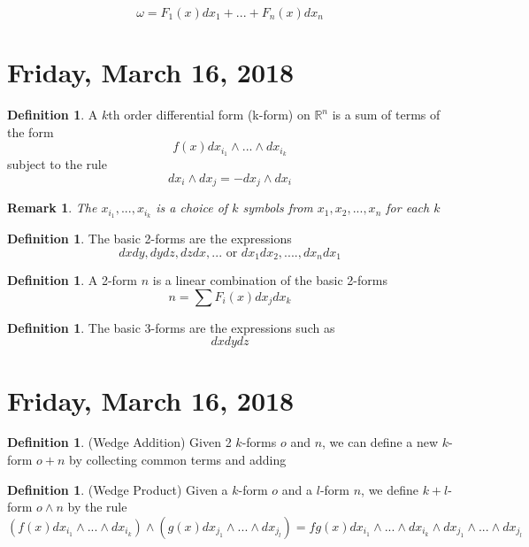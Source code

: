 \documentclass[12pt]{article}
\theoremstyle{plain}
\newtheorem*{remark}{Remark}
\theoremstyle{definition}
\newtheorem{definition}[theorem]{Definition}
\begin{document}
$$\omega = F_1 (x) dx_1 + ... + F_n (x) dx_n$$

\newpage

\section{Friday, March 16, 2018}

\begin{definition}
    A $k$th order differential form (k-form) on $\mathbb{R}^n$ is a sum of terms of the form
    $$f(x) dx_{i_1} \wedge ... \wedge dx_{i_k}$$
    subject to the rule
    $$dx_i \wedge dx_j = - dx_j \wedge dx_i$$
\end{definition}

\begin{remark}
    The $x_{i_1},...,x_{i_k}$ is a choice of $k$ symbols from $x_1, x_2, ..., x_n$ for each $k$
\end{remark}

\begin{definition}
    The basic 2-forms are the expressions
    $$dxdy, dydz,dzdx, ... \text{ or } dx_1 dx_2 ,...., dx_n dx_1$$
\end{definition}

\begin{definition}
    A 2-form $n$ is a linear combination of the basic 2-forms
    $$n=\sum F_i (x) dx_j dx_k$$
\end{definition}

\begin{definition}
    The basic 3-forms are the expressions such as
    $$dxdydz$$
\end{definition}
\newpage

\section{Friday, March 16, 2018}

\begin{definition}
    (Wedge Addition) Given 2 $k$-forms $o$ and $n$, we can define a new $k$-form $o + n$ by collecting common terms and adding
\end{definition}

\begin{definition}
    (Wedge Product) Given a $k$-form $o$ and a $l$-form $n$, we define $k+l$-form $o \wedge n$ by the rule
    $$(f(x)dx_{i_1}\wedge ... \wedge dx_{i_k})\wedge(g(x)dx_{j_1}\wedge ... \wedge dx_{j_l}) = fg(x)dx_{i_1}\wedge ... \wedge dx_{i_k} \wedge dx_{j_1}\wedge ... \wedge dx_{j_l} $$
\end{definition}
\end{document}
